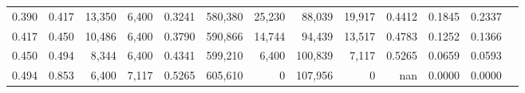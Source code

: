 \begin{tabular}{rrrrrrrrrrrrr}
0.390 & 0.417 &  13,350 & 6,400 &                                     0.3241 & 580,380 &  25,230 &  88,039 &  19,917 & 0.4412 & 0.1845 & 0.2337 \\
0.417 & 0.450 &  10,486 & 6,400 &                                     0.3790 & 590,866 &  14,744 &  94,439 &  13,517 & 0.4783 & 0.1252 & 0.1366 \\
0.450 & 0.494 &   8,344 & 6,400 &                                     0.4341 & 599,210 &   6,400 & 100,839 &   7,117 & 0.5265 & 0.0659 & 0.0593 \\
0.494 & 0.853 &   6,400 & 7,117 &                                     0.5265 & 605,610 &       0 & 107,956 &       0 &    nan & 0.0000 & 0.0000 \\
\bottomrule
\end{tabular}
